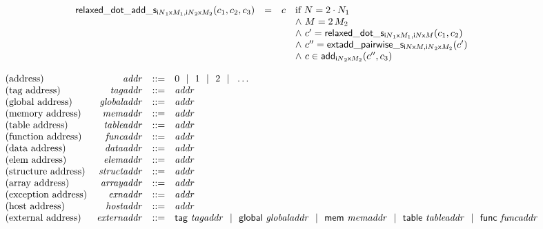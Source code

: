 $$
\begin{array}[t]{@{}lcl@{}l@{}}
{{\mathsf{relaxed\_dot\_add}}{\mathsf{\_}}{\mathsf{s}}}{{}_{{{{\mathsf{i}}{N}}_1}{\mathsf{x}}{M_1}, {{{\mathsf{i}}{N}}_2}{\mathsf{x}}{M_2}}(c_1, c_2, c_3)} & = & c & \quad
\begin{array}[t]{@{}l@{}}
\mbox{if}~ N = 2 \cdot N_1 \\
{\land}~ M = 2 \, M_2 \\
{\land}~ {c'} = {{\mathsf{relaxed\_dot}}{\mathsf{\_}}{\mathsf{s}}}{{}_{{{{\mathsf{i}}{N}}_1}{\mathsf{x}}{M_1}, {{\mathsf{i}}{N}}{\mathsf{x}}{M}}(c_1, c_2)} \\
{\land}~ {c''} = {{\mathsf{extadd\_pairwise}}{\mathsf{\_}}{\mathsf{s}}}{{}_{{{\mathsf{i}}{N}}{\mathsf{x}}{M}, {{{\mathsf{i}}{N}}_2}{\mathsf{x}}{M_2}}({c'})} \\
{\land}~ c \in {\mathsf{add}}{{}_{{{{\mathsf{i}}{N}}_2}{\mathsf{x}}{M_2}}({c''}, c_3)} \\
\end{array} \\
\end{array}
$$

\vspace{1ex}

$$
\begin{array}[t]{@{}lrrl@{}l@{}}
\mbox{(address)} & {\mathit{addr}} & ::= & 0 ~~|~~ 1 ~~|~~ 2 ~~|~~ \dots \\
\mbox{(tag address)} & {\mathit{tagaddr}} & ::= & {\mathit{addr}} \\
\mbox{(global address)} & {\mathit{globaladdr}} & ::= & {\mathit{addr}} \\
\mbox{(memory address)} & {\mathit{memaddr}} & ::= & {\mathit{addr}} \\
\mbox{(table address)} & {\mathit{tableaddr}} & ::= & {\mathit{addr}} \\
\mbox{(function address)} & {\mathit{funcaddr}} & ::= & {\mathit{addr}} \\
\mbox{(data address)} & {\mathit{dataaddr}} & ::= & {\mathit{addr}} \\
\mbox{(elem address)} & {\mathit{elemaddr}} & ::= & {\mathit{addr}} \\
\mbox{(structure address)} & {\mathit{structaddr}} & ::= & {\mathit{addr}} \\
\mbox{(array address)} & {\mathit{arrayaddr}} & ::= & {\mathit{addr}} \\
\mbox{(exception address)} & {\mathit{exnaddr}} & ::= & {\mathit{addr}} \\
\mbox{(host address)} & {\mathit{hostaddr}} & ::= & {\mathit{addr}} \\
\mbox{(external address)} & {\mathit{externaddr}} & ::= & \mathsf{tag}~{\mathit{tagaddr}} ~~|~~ \mathsf{global}~{\mathit{globaladdr}} ~~|~~ \mathsf{mem}~{\mathit{memaddr}} ~~|~~ \mathsf{table}~{\mathit{tableaddr}} ~~|~~ \mathsf{func}~{\mathit{funcaddr}} \\
\end{array}
$$

